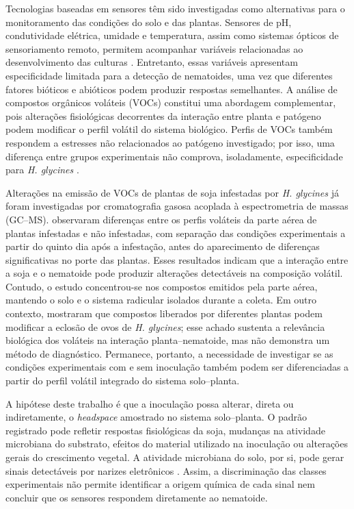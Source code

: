 Tecnologias baseadas em sensores têm sido investigadas como alternativas para o monitoramento das condições do solo e das plantas. Sensores de pH, condutividade elétrica, umidade e temperatura, assim como sistemas ópticos de sensoriamento remoto, permitem acompanhar variáveis relacionadas ao desenvolvimento das culturas \cite{santos2022}. Entretanto, essas variáveis apresentam especificidade limitada para a detecção de nematoides, uma vez que diferentes fatores bióticos e abióticos podem produzir respostas semelhantes. A análise de compostos orgânicos voláteis (VOCs) constitui uma abordagem complementar, pois alterações fisiológicas decorrentes da interação entre planta e patógeno podem modificar o perfil volátil do sistema biológico. Perfis de VOCs também respondem a estresses não relacionados ao patógeno investigado; por isso, uma diferença entre grupos experimentais não comprova, isoladamente, especificidade para \textit{H. glycines} \cite{gan2023}.

Alterações na emissão de VOCs de plantas de soja infestadas por \textit{H. glycines} já foram investigadas por cromatografia gasosa acoplada à espectrometria de massas (GC--MS).  observaram diferenças entre os perfis voláteis da parte aérea de plantas infestadas e não infestadas, com separação das condições experimentais a partir do quinto dia após a infestação, antes do aparecimento de diferenças significativas no porte das plantas. Esses resultados indicam que a interação entre a soja e o nematoide pode produzir alterações detectáveis na composição volátil. Contudo, o estudo concentrou-se nos compostos emitidos pela parte aérea, mantendo o solo e o sistema radicular isolados durante a coleta. Em outro contexto,  mostraram que compostos liberados por diferentes plantas podem modificar a eclosão de ovos de \textit{H. glycines}; esse achado sustenta a relevância biológica dos voláteis na interação planta--nematoide, mas não demonstra um método de diagnóstico. Permanece, portanto, a necessidade de investigar se as condições experimentais com e sem inoculação também podem ser diferenciadas a partir do perfil volátil integrado do sistema solo--planta.

A hipótese deste trabalho é que a inoculação possa alterar, direta ou indiretamente, o \textit{headspace} amostrado no sistema solo--planta. O padrão registrado pode refletir respostas fisiológicas da soja, mudanças na atividade microbiana do substrato, efeitos do material utilizado na inoculação ou alterações gerais do crescimento vegetal. A atividade microbiana do solo, por si, pode gerar sinais detectáveis por narizes eletrônicos \cite{decesare2011}. Assim, a discriminação das classes experimentais não permite identificar a origem química de cada sinal nem concluir que os sensores respondem diretamente ao nematoide.

